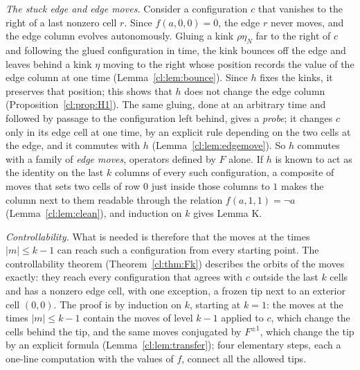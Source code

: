\documentclass[11pt]{amsart}
\theoremstyle{definition}
\theoremstyle{remark}
\theoremstyle{plain}
\begin{document}
\emph{The stuck edge and edge moves.} Consider a configuration $c$ that vanishes to the right of a last nonzero cell $r$. Since $f(a,0,0)=0$, the edge $r$ never moves, and the edge column evolves autonomously. Gluing a kink $\rho\eta_N$ far to the right of $c$ and following the glued configuration in time, the kink bounces off the edge and leaves behind a kink $\eta$ moving to the right whose position records the value of the edge column at one time (Lemma~\ref{cl:lem:bounce}). Since $h$ fixes the kinks, it preserves that position; this shows that $h$ does not change the edge column (Proposition~\ref{cl:prop:H1}). The same gluing, done at an arbitrary time and followed by passage to the configuration left behind, gives a \emph{probe}; it changes $c$ only in its edge cell at one time, by an explicit rule depending on the two cells at the edge, and it commutes with $h$ (Lemma~\ref{cl:lem:edgemove}). So $h$ commutes with a family of \emph{edge moves}, operators defined by $F$ alone. If $h$ is known to act as the identity on the last $k$ columns of every such configuration, a composite of moves that sets two cells of row $0$ just inside those columns to $1$ makes the column next to them readable through the relation $f(a,1,1)=\neg a$ (Lemma~\ref{cl:lem:clean}), and induction on $k$ gives Lemma K.

\emph{Controllability.} What is needed is therefore that the moves at the times $|m|\le k-1$ can reach such a configuration from every starting point. The controllability theorem (Theorem~\ref{cl:thm:Fk}) describes the orbits of the moves exactly: they reach every configuration that agrees with $c$ outside the last $k$ cells and has a nonzero edge cell, with one exception, a frozen tip next to an exterior cell $(0,0)$. The proof is by induction on $k$, starting at $k=1$: the moves at the times $|m|\le k-1$ contain the moves of level $k-1$ applied to $c$, which change the cells behind the tip, and the same moves conjugated by $F^{\pm1}$, which change the tip by an explicit formula (Lemma~\ref{cl:lem:transfer}); four elementary steps, each a one-line computation with the values of $f$, connect all the allowed tips.
\end{document}
